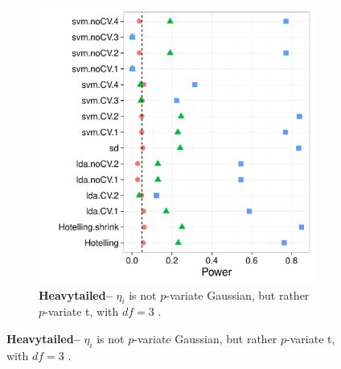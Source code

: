 \documentclass[12pt,a4paper]{article}
\theoremstyle{definition}
\begin{document}
\begin{figure}[h]
\begin{subfigure}{.5\textwidth}
	  \includegraphics[width=1\linewidth]{"art/2016-08-04 19:32:17"}
	  \caption{\textbf{Heavytailed--} $\eta_i$ is not $p$-variate Gaussian, but rather $p$-variate t, with $df=3$ .  } 
	\label{fig:t_null}
	\end{subfigure}
\end{figure}
\end{document}
